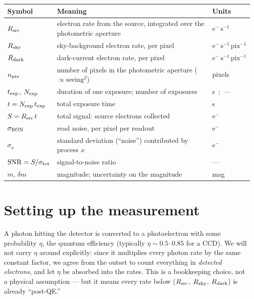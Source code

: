 \documentclass[11pt]{article}
\begin{document}
\begin{center}
\begin{tabular}{@{}l p{9.4cm} l@{}}
\toprule
\textbf{Symbol} & \textbf{Meaning} & \textbf{Units} \\
\midrule
$R_{\rm src}$ & electron rate from the source, integrated over the photometric aperture & $\mathrm{e^-\,s^{-1}}$ \\
$R_{\rm sky}$ & sky-background electron rate, per pixel & $\mathrm{e^-\,s^{-1}\,pix^{-1}}$ \\
$R_{\rm dark}$ & dark-current electron rate, per pixel & $\mathrm{e^-\,s^{-1}\,pix^{-1}}$ \\
$n_{\rm pix}$ & number of pixels in the photometric aperture ($\propto \mathrm{seeing}^2$) & pixels \\
$t_{\rm exp}$, $N_{\rm exp}$ & duration of one exposure; number of exposures & s\ ;\ --- \\
$t = N_{\rm exp}\,t_{\rm exp}$ & total exposure time & s \\
$S = R_{\rm src}\,t$ & total signal: source electrons collected & $\mathrm{e^-}$ \\
$\sigma_{\rm RON}$ & read noise, per pixel per readout & $\mathrm{e^-}$ \\
$\sigma_x$ & standard deviation (``noise'') contributed by process $x$ & $\mathrm{e^-}$ \\
$\mathrm{SNR} = S/\sigma_{\rm tot}$ & signal-to-noise ratio & --- \\
$m$, $\delta m$ & magnitude; uncertainty on the magnitude & mag \\
\bottomrule
\end{tabular}
\end{center}

\section*{Setting up the measurement}

A photon hitting the detector is converted to a photoelectron with some probability $\eta$, the
quantum efficiency (typically $\eta \sim 0.5$--$0.85$ for a CCD). We will not carry $\eta$ around
explicitly: since it multiplies every photon rate by the same constant factor, we agree from the
outset to count everything in \emph{detected electrons}, and let $\eta$ be absorbed into the rates.
This is a bookkeeping choice, not a physical assumption --- but it means every rate below ($R_{\rm src}$,
$R_{\rm sky}$, $R_{\rm dark}$) is already ``post-QE.''
\end{document}
